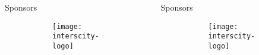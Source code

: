\begin{frame}[fragile]
\begin{columns}[T]
  \begin{block}{Sponsors}
    \centering
    \begin{figure}[H] %
      \begin{subfigure}{.3\textwidth}
        \centering
        \texttt{[image: interscity-logo]}
      \end{subfigure}
      \begin{subfigure}{.3\textwidth}
        \centering
      \end{subfigure}
      \begin{subfigure}{.3\textwidth}
        \centering
      \end{subfigure}
    \end{figure}
  \end{block}

  \onethirdcol

  \begin{block}{Sponsors}
    \centering
    \begin{figure}[H] %
      \begin{subfigure}{.3\textwidth}
        \centering
        \texttt{[image: interscity-logo]}
      \end{subfigure}
      \begin{subfigure}{.3\textwidth}
        \centering
      \end{subfigure}
      \begin{subfigure}{.3\textwidth}
        \centering
      \end{subfigure}
    \end{figure}
  \end{block}

\end{columns}

\end{frame}

